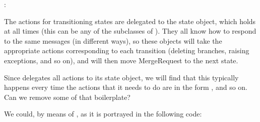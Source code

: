 \documentclass[a4paper,10pt,english]{sphinxmanual}
\begin{document}
\begin{sphinxVerbatim}[commandchars=\\\{\}]
   
  
: 
\end{sphinxVerbatim}

The actions for transitioning states are delegated to the state object, which 
holds at all times (this can be any of the subclasses of ). They all know how to respond
to the same messages (in different ways), so these objects will take the appropriate actions
corresponding to each transition (deleting branches, raising exceptions, and so on), and
will then move MergeRequest to the next state.

Since  delegates all actions to its state object, we will find that this
typically happens every time the actions that it needs to do are in the form
, and so on. Can we remove some of that boilerplate?

We could, by means of , as it is portrayed in the following code:
\end{document}
